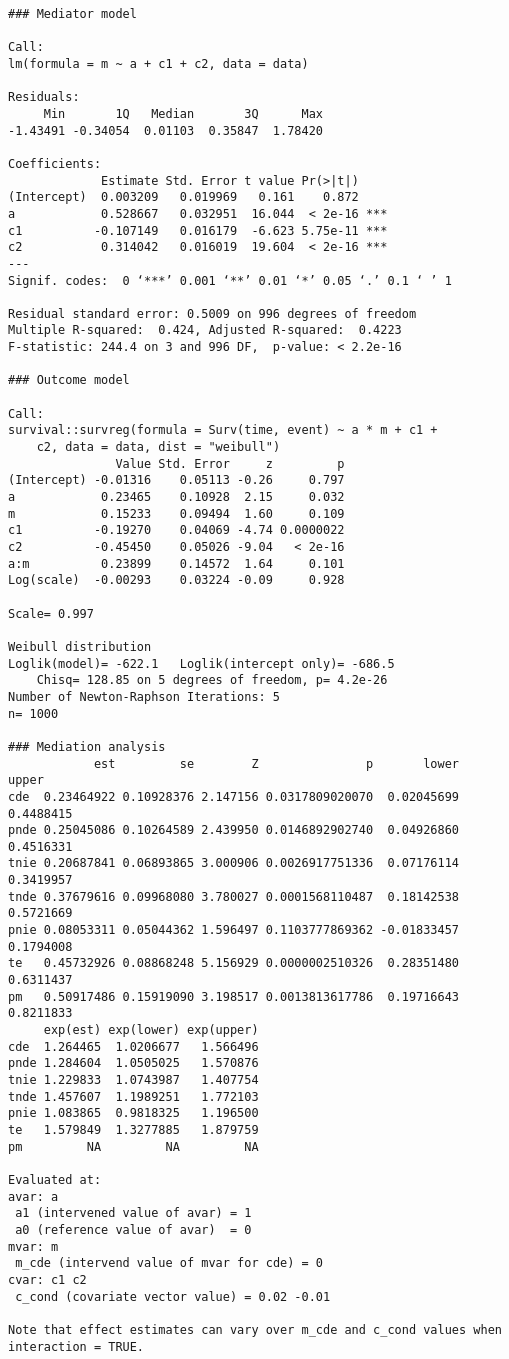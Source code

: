 \documentclass[10pt]{article}
\begin{document}
\begin{verbatim}
### Mediator model

Call:
lm(formula = m ~ a + c1 + c2, data = data)

Residuals:
     Min       1Q   Median       3Q      Max 
-1.43491 -0.34054  0.01103  0.35847  1.78420 

Coefficients:
             Estimate Std. Error t value Pr(>|t|)    
(Intercept)  0.003209   0.019969   0.161    0.872    
a            0.528667   0.032951  16.044  < 2e-16 ***
c1          -0.107149   0.016179  -6.623 5.75e-11 ***
c2           0.314042   0.016019  19.604  < 2e-16 ***
---
Signif. codes:  0 ‘***’ 0.001 ‘**’ 0.01 ‘*’ 0.05 ‘.’ 0.1 ‘ ’ 1

Residual standard error: 0.5009 on 996 degrees of freedom
Multiple R-squared:  0.424,	Adjusted R-squared:  0.4223 
F-statistic: 244.4 on 3 and 996 DF,  p-value: < 2.2e-16

### Outcome model

Call:
survival::survreg(formula = Surv(time, event) ~ a * m + c1 + 
    c2, data = data, dist = "weibull")
               Value Std. Error     z         p
(Intercept) -0.01316    0.05113 -0.26     0.797
a            0.23465    0.10928  2.15     0.032
m            0.15233    0.09494  1.60     0.109
c1          -0.19270    0.04069 -4.74 0.0000022
c2          -0.45450    0.05026 -9.04   < 2e-16
a:m          0.23899    0.14572  1.64     0.101
Log(scale)  -0.00293    0.03224 -0.09     0.928

Scale= 0.997 

Weibull distribution
Loglik(model)= -622.1   Loglik(intercept only)= -686.5
	Chisq= 128.85 on 5 degrees of freedom, p= 4.2e-26 
Number of Newton-Raphson Iterations: 5 
n= 1000 

### Mediation analysis 
            est         se        Z               p       lower     upper
cde  0.23464922 0.10928376 2.147156 0.0317809020070  0.02045699 0.4488415
pnde 0.25045086 0.10264589 2.439950 0.0146892902740  0.04926860 0.4516331
tnie 0.20687841 0.06893865 3.000906 0.0026917751336  0.07176114 0.3419957
tnde 0.37679616 0.09968080 3.780027 0.0001568110487  0.18142538 0.5721669
pnie 0.08053311 0.05044362 1.596497 0.1103777869362 -0.01833457 0.1794008
te   0.45732926 0.08868248 5.156929 0.0000002510326  0.28351480 0.6311437
pm   0.50917486 0.15919090 3.198517 0.0013813617786  0.19716643 0.8211833
     exp(est) exp(lower) exp(upper)
cde  1.264465  1.0206677   1.566496
pnde 1.284604  1.0505025   1.570876
tnie 1.229833  1.0743987   1.407754
tnde 1.457607  1.1989251   1.772103
pnie 1.083865  0.9818325   1.196500
te   1.579849  1.3277885   1.879759
pm         NA         NA         NA

Evaluated at:
avar: a
 a1 (intervened value of avar) = 1
 a0 (reference value of avar)  = 0
mvar: m
 m_cde (intervend value of mvar for cde) = 0
cvar: c1 c2
 c_cond (covariate vector value) = 0.02 -0.01

Note that effect estimates can vary over m_cde and c_cond values when interaction = TRUE.
\end{verbatim}
\end{document}

